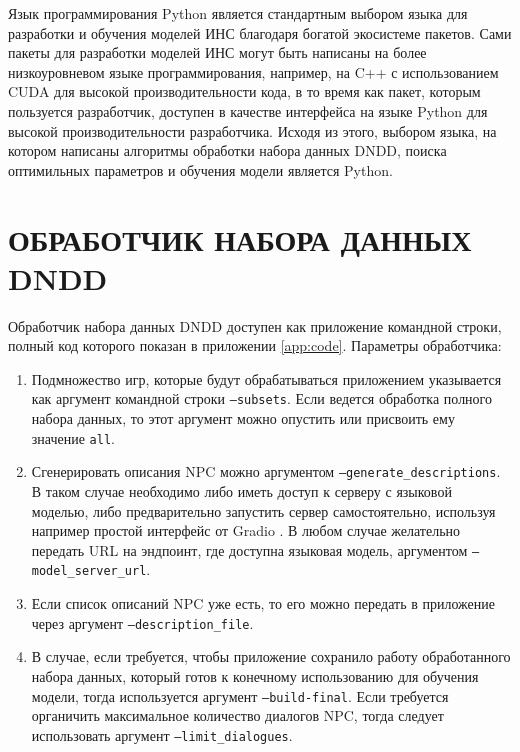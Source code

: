 Язык программирования Python \cite{python-lang-site} является стандартным выбором языка для разработки и обучения моделей ИНС благодаря богатой экосистеме пакетов. Сами пакеты для разработки моделей ИНС могут быть написаны на более низкоуровневом языке программирования, например, на C++ \cite{cpp-docs} с использованием CUDA \cite{cuda-docs} для высокой производительности кода, в то время как пакет, которым пользуется разработчик, доступен в качестве интерфейса на языке Python для высокой производительности разработчика. Исходя из этого, выбором языка, на котором написаны алгоритмы обработки набора данных DNDD, поиска оптимильных параметров и обучения модели является Python.

\section{ОБРАБОТЧИК НАБОРА ДАННЫХ DNDD}
Обработчик набора данных DNDD доступен как приложение командной строки, полный код которого показан в приложении \ref{app:code}. Параметры обработчика:
\begin{enumerate}
    \item Подмножество игр, которые будут обрабатываться приложением указывается как аргумент командной строки \texttt{--subsets}. Если ведется обработка полного набора данных, то этот аргумент можно опустить или присвоить ему значение \texttt{all}.
    \item Сгенерировать описания NPC можно аргументом \texttt{--generate\_descriptions}. В таком случае необходимо либо иметь доступ к серверу с языковой моделью, либо предварительно запустить сервер самостоятельно, используя например простой интерфейс от Gradio \cite{gradio-docs}. В любом случае желательно передать URL на эндпоинт, где доступна языковая модель, аргументом \texttt{--model\_server\_url}.
    \item Если список описаний NPC уже есть, то его можно передать в приложение через аргумент \texttt{--description\_file}.
    \item В случае, если требуется, чтобы приложение сохранило работу обработанного набора данных, который готов к конечному использованию для обучения модели, тогда используется аргумент \texttt{--build-final}. Если требуется органичить максимальное количество диалогов NPC, тогда следует использовать аргумент \texttt{--limit\_dialogues}.
\end{enumerate}

